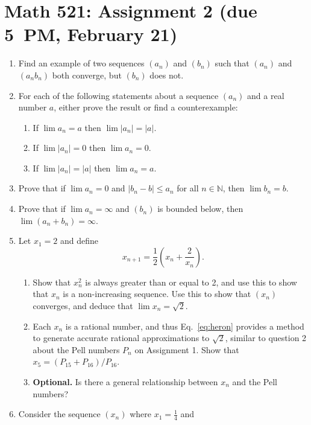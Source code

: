 \documentclass[12pt]{article}
\newcommand{\N}{\mathbb{N}}
\begin{document}
\section*{Math 521: Assignment 2 (due 5~PM, February 21)}
\begin{enumerate}
  \item Find an example of two sequences $(a_n)$ and $(b_n)$ such that
    $(a_n)$ and $(a_nb_n)$ both converge, but $(b_n)$ does not.
  \item For each of the following statements about a sequence $(a_n)$ and a
    real number $a$, either prove the result or find a counterexample:
    \begin{enumerate}
      \item If $\lim a_n = a$ then $\lim |a_n|=|a|$.
      \item If $\lim |a_n|=0$ then $\lim a_n=0$.
      \item If $\lim |a_n|=|a|$ then $\lim a_n = a$.
    \end{enumerate}
  \item Prove that if $\lim a_n =0$ and $|b_n-b| \le a_n$ for all $n\in
    \N$, then $\lim b_n=b$.
  \item Prove that if $\lim a_n = \infty$ and $(b_n)$ is bounded below,
    then $\lim (a_n+b_n) = \infty$.
  \item Let $x_1=2$ and define
    \begin{equation}
      x_{n+1} = \frac12 \left( x_n + \frac2{x_n}\right).
      \label{eq:heron}
    \end{equation}
    \begin{enumerate}
      \item Show that $x_n^2$ is always greater than or equal to 2, and use
        this to show that $x_n$ is a non-increasing sequence. Use this to show
        that $(x_n)$ converges, and deduce that $\lim x_n = \sqrt{2}$.
      \item Each $x_n$ is a rational number, and thus Eq.~\eqref{eq:heron}
        provides a method to generate accurate rational approximations
        to $\sqrt{2}$, similar to question 2 about the Pell numbers $P_n$ on
        Assignment 1. Show that $x_5 = (P_{15}+P_{16})/P_{16}$.
      \item \textbf{Optional.} Is there a general relationship between $x_n$
        and the Pell numbers?
    \end{enumerate}
  \item
    Consider the sequence $(x_n)$ where $x_1=\frac14$ and
    \begin{equation}

\end{equation}
\end{enumerate}
\end{document}
